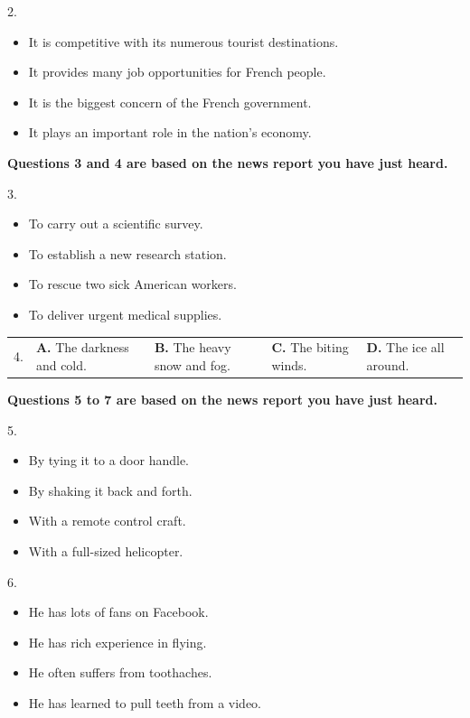 \documentclass[UTF8,11pt]{ctexart}
\begin{document}
2.


\begin{itemize}[leftmargin=2em,itemsep=.2em,topsep=.4em]\item[A.] It is competitive with its numerous tourist destinations.
\item[B.] It provides many job opportunities for French people.
\item[C.] It is the biggest concern of the French government.
\item[D.] It plays an important role in the nation’s economy.
\end{itemize}

\textbf{Questions 3 and 4 are based on the news report you have just heard.}


3.


\begin{itemize}[leftmargin=2em,itemsep=.2em,topsep=.4em]\item[A.] To carry out a scientific survey.
\item[B.] To establish a new research station.
\item[C.] To rescue two sick American workers.
\item[D.] To deliver urgent medical supplies.
\end{itemize}

\noindent\begin{tabularx}{\linewidth}{@{}lXXXX@{}}4. & \textbf{A.} The darkness and cold. & \textbf{B.} The heavy snow and fog. & \textbf{C.} The biting winds. & \textbf{D.} The ice all around.\\\end{tabularx}\par

\textbf{Questions 5 to 7 are based on the news report you have just heard.}


5.


\begin{itemize}[leftmargin=2em,itemsep=.2em,topsep=.4em]\item[A.] By tying it to a door handle.
\item[B.] By shaking it back and forth.
\item[C.] With a remote control craft.
\item[D.] With a full-sized helicopter.
\end{itemize}

6.


\begin{itemize}[leftmargin=2em,itemsep=.2em,topsep=.4em]\item[A.] He has lots of fans on Facebook.
\item[B.] He has rich experience in flying.
\item[C.] He often suffers from toothaches.
\item[D.] He has learned to pull teeth from a video.
\end{itemize}
\end{document}
